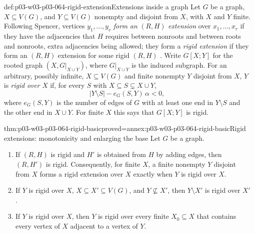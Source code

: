 \begin{hbdefinition}{def:p03-w03-p03-064-rigid-extension}{Extensions inside a graph}
Let \(G\) be a graph, \(X\subseteq V(G)\), and \(Y\subseteq V(G)\) nonempty
and disjoint from \(X\), with \(X\) and \(Y\) finite.  Following Spencer,
vertices \(y_1,\ldots,y_v\) \emph{form an \((R,H)\) extension} over
\(x_1,\ldots,x_r\) if they have the adjacencies that \(H\) requires between
nonroots and between roots and nonroots, extra adjacencies being allowed; they
form a \emph{rigid extension} if they form an \((R,H)\) extension for some
rigid \((R,H)\) \cite[p.~8]{Spencer2007LogicRandomStructuresAuthor}.
Write \(G[X;Y]\) for the rooted graph \((X,G|_{X\cup Y})\), where
\(G|_{X\cup Y}\) is the induced subgraph.  For an arbitrary, possibly
infinite, \(X\subseteq V(G)\) and finite nonempty \(Y\) disjoint from \(X\),
\(Y\) is \emph{rigid over \(X\)} if, for every \(S\) with
\(X\subseteq S\subsetneq X\cup Y\),
\[
  |Y\setminus S|-e_G(S,Y)\,\alpha<0,
\]
where \(e_G(S,Y)\) is the number of edges of \(G\) with at least one end in
\(Y\setminus S\) and the other end in \(X\cup Y\).  For finite \(X\) this
says that \(G[X;Y]\) is rigid.
\end{hbdefinition}

\begin{hblemma}{thm:p03-w03-p03-064-rigid-basic}{proved=annex:p03-w03-p03-064-rigid-basic}{Rigid extensions: monotonicity and enlarging the base}
Let \(G\) be a graph.
\begin{enumerate}
\item If \((R,H)\) is rigid and \(H'\) is obtained from \(H\) by adding
  edges, then \((R,H')\) is rigid.  Consequently, for finite \(X\), a finite
  nonempty \(Y\) disjoint from \(X\) forms a rigid extension over \(X\)
  exactly when \(Y\) is rigid over \(X\).
\item If \(Y\) is rigid over \(X\), \(X\subseteq X'\subseteq V(G)\), and
  \(Y\not\subseteq X'\), then \(Y\setminus X'\) is rigid over \(X'\).
\item If \(Y\) is rigid over \(X\), then \(Y\) is rigid over every finite
  \(X_0\subseteq X\) that contains every vertex of \(X\) adjacent to a vertex
  of \(Y\).
\end{enumerate}
\end{hblemma}

